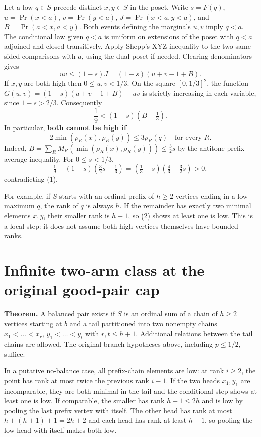 \documentclass[11pt,letterpaper]{article}
\begin{document}
Let a low \(q\in S\) precede distinct \(x,y\in S\) in the poset. Write
\(s=F(q)\), \(u=\Pr(x<a)\), \(v=\Pr(y<a)\), \(J=\Pr(x<a,y<a)\), and
\(B=\Pr(a<x,a<y)\). Both events defining the marginals \(u,v\) imply
\(q<a\). The conditional law given \(q<a\) is uniform on extensions of
the poset with \(q<a\) adjoined and closed transitively. Apply Shepp's
XYZ inequality to the two same-sided comparisons with \(a\), using the
dual poset if needed. Clearing denominators gives \[
   uv\le (1-s) J=(1-s)(u+v-1+B).
\] If \(x,y\) are both high then \(0\le u,v<1/3\). On the square
\([0,1/3]^2\), the function \(G(u,v)=(1-s)(u+v-1+B)-uv\) is strictly
increasing in each variable, since \(1-s>2/3\). Consequently \[
  \frac19 < (1-s)(B-\tfrac13).                    \tag{1}
\] In particular, \textbf{both cannot be high if} \[
  2\min(\rho_R(x),\rho_R(y))\le3\rho_R(q)
  \quad\text{for every }R.                         \tag{2}
\] Indeed, \(B=\sum_R M_R(\min(\rho_R(x),\rho_R(y)))\le\frac32s\) by the
antitone prefix average inequality. For \(0\le s<1/3\), \[
  \tfrac19-(1-s)(\tfrac32s-\tfrac13)
  =(\tfrac13-s)(\tfrac43-\tfrac32s)>0,
\] contradicting (1).

For example, if \(S\) starts with an ordinal prefix of \(h\ge2\)
vertices ending in a low maximum \(q\), the rank of \(q\) is always
\(h\). If the remainder has exactly two minimal elements \(x,y\), their
smaller rank is \(h+1\), so (2) shows at least one is low. This is a
local step: it does not assume both high vertices themselves have
bounded ranks.

\section{Infinite two-arm class at the original good-pair
cap}\label{infinite-two-arm-class-at-the-original-good-pair-cap}

\textbf{Theorem.} A balanced pair exists if \(S\) is an ordinal sum of a
chain of \(h\ge2\) vertices starting at \(b\) and a tail partitioned
into two nonempty chains \(x_1<\dots<x_r\), \(y_1<\dots<y_t\) with
\(r,t\le h+1\). Additional relations between the tail chains are
allowed. The original branch hypotheses above, including \(p\le1/2\),
suffice.

In a putative no-balance case, all prefix-chain elements are low: at
rank \(i\ge2\), the point has rank at most twice the previous rank
\(i-1\). If the two heads \(x_1,y_1\) are incomparable, they are both
minimal in the tail and the conditional step shows at least one is low.
If comparable, the smaller has rank \(h+1\le2h\) and is low by pooling
the last prefix vertex with itself. The other head has rank at most
\(h+(h+1)+1=2h+2\) and each head has rank at least \(h+1\), so pooling
the low head with itself makes both low.
\end{document}
